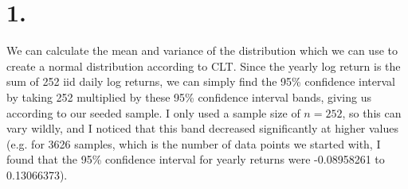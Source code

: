 \documentclass{article}
\begin{document}
\thispagestyle{firstpageheader}

\section*{1.}
{\Large 



We can calculate the mean and variance of the distribution which we can use to create a normal distribution according to CLT. Since the yearly log return is the sum of 252 iid daily log returns, we can simply find the 95\% confidence interval by taking 252 multiplied by these 95\% confidence interval bands, giving us  according to our seeded sample. I only used a sample size of $n = 252$, so this can vary wildly, and I noticed that this band decreased significantly at higher values (e.g. for 3626 samples, which is the number of data points we started with, I found that the 95\% confidence interval for yearly returns were -0.08958261 to 0.13066373).

}
\end{document}
